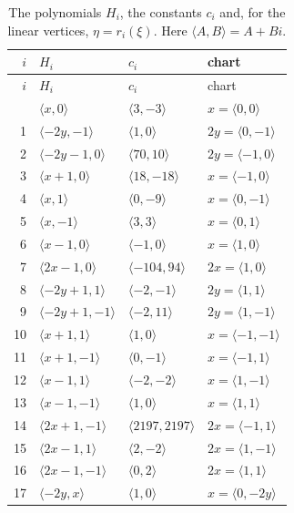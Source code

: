 \documentclass[11pt]{article}
\begin{document}
\clearpage
\begingroup\small
\setlength{\LTcapwidth}{\textwidth}
\begin{longtable}{@{}rlll@{}}
\caption{The polynomials $H_i$, the constants $c_i$ and, for the linear vertices, $\eta=r_i(\xi)$. Here $\langle A,B\rangle=A+Bi$.}\label{tab:vert1}\\
\hline $i$ & $H_i$ & $c_i$ & chart\\\hline\endfirsthead\hline $i$ & $H_i$ & $c_i$ & chart\\\hline\endhead\hline\endfoot
0 & $\langle x,0\rangle$ & $\langle 3,-3\rangle$ & $x=\langle 0,0\rangle$\\
1 & $\langle -2y,-1\rangle$ & $\langle 1,0\rangle$ & $2y=\langle 0,-1\rangle$\\
2 & $\langle -2y-1,0\rangle$ & $\langle 70,10\rangle$ & $2y=\langle -1,0\rangle$\\
3 & $\langle x+1,0\rangle$ & $\langle 18,-18\rangle$ & $x=\langle -1,0\rangle$\\
4 & $\langle x,1\rangle$ & $\langle 0,-9\rangle$ & $x=\langle 0,-1\rangle$\\
5 & $\langle x,-1\rangle$ & $\langle 3,3\rangle$ & $x=\langle 0,1\rangle$\\
6 & $\langle x-1,0\rangle$ & $\langle -1,0\rangle$ & $x=\langle 1,0\rangle$\\
7 & $\langle 2x-1,0\rangle$ & $\langle -104,94\rangle$ & $2x=\langle 1,0\rangle$\\
8 & $\langle -2y+1,1\rangle$ & $\langle -2,-1\rangle$ & $2y=\langle 1,1\rangle$\\
9 & $\langle -2y+1,-1\rangle$ & $\langle -2,11\rangle$ & $2y=\langle 1,-1\rangle$\\
10 & $\langle x+1,1\rangle$ & $\langle 1,0\rangle$ & $x=\langle -1,-1\rangle$\\
11 & $\langle x+1,-1\rangle$ & $\langle 0,-1\rangle$ & $x=\langle -1,1\rangle$\\
12 & $\langle x-1,1\rangle$ & $\langle -2,-2\rangle$ & $x=\langle 1,-1\rangle$\\
13 & $\langle x-1,-1\rangle$ & $\langle 1,0\rangle$ & $x=\langle 1,1\rangle$\\
14 & $\langle 2x+1,-1\rangle$ & $\langle 2197,2197\rangle$ & $2x=\langle -1,1\rangle$\\
15 & $\langle 2x-1,1\rangle$ & $\langle 2,-2\rangle$ & $2x=\langle 1,-1\rangle$\\
16 & $\langle 2x-1,-1\rangle$ & $\langle 0,2\rangle$ & $2x=\langle 1,1\rangle$\\
17 & $\langle -2y,x\rangle$ & $\langle 1,0\rangle$ & $x=\langle 0,-2y\rangle$\\

\end{longtable}
\end{document}
